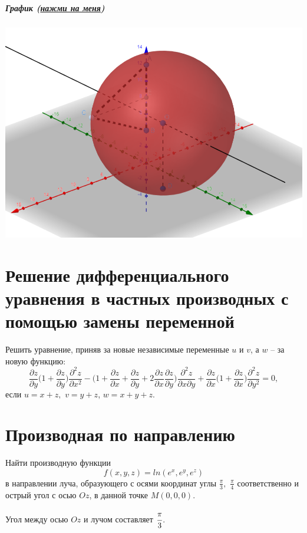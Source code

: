 \documentclass[12pt]{report}
\begin{document}
\paragraph{График (\href{https://www.geogebra.org/3d/fqvczfu9}{нажми на меня})}
\begin{center}
    \includegraphics[scale=0.8]{task2.png}
\end{center}
\chapter{Решение дифференциального уравнения в частных
производных с помощью замены переменной}
Решить уравнение, приняв за новые независимые переменные $u$ и $v$, а $w$ -- за
новую функцию:
$$ \frac{\partial z}{\partial y}\Bigg(1+\frac{\partial z}{\partial y}\Bigg)\frac{\partial^2 z}{\partial x^2} - \Bigg(1+\frac{\partial z}{\partial x}+\frac{\partial z}{\partial y}+2\frac{\partial z}{\partial x}\frac{\partial z}{\partial y}\Bigg)\frac{\partial^2 z}{\partial x \partial y}+\frac{\partial z}{\partial x}\Bigg(1+\frac{\partial z}{\partial x}\Bigg)\frac{\partial^2 z}{\partial y^2}=0,$$
если $u=x+z,$ $v=y+z$, $w=x+y+z$.
\chapter{Производная по направлению}
Найти производную функции 
$$f(x,y,z)=ln(e^x,e^y,e^z)$$ 
в направлении луча, образующего с осями координат углы $\frac{\pi}{3},$ $\frac{\pi}{4}$ соответственно и острый угол с осью $Oz$, в данной точке $M(0,0,0)$.

Угол между осью $Oz$ и лучом составляет $\cfrac{\pi}{3}$. 
\end{document}
